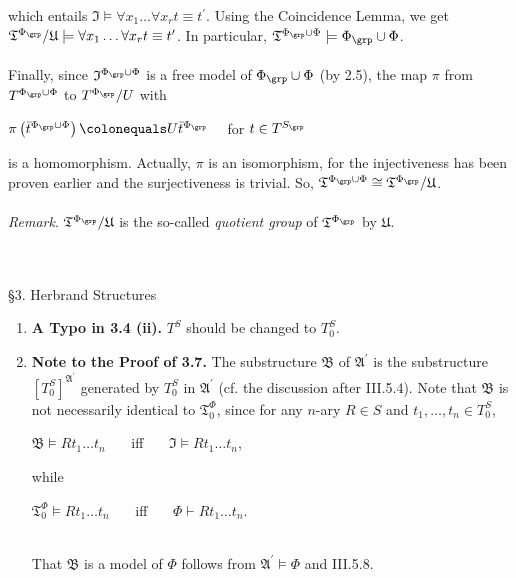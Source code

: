\begin{enumerate}[1.]
which entails $\mathfrak{I} \models \forall x_1 \ldots \forall x_r t \equiv t^\prime$. Using the Coincidence Lemma, we get $\mathfrak{T}^{\Phi_\grp} \slash \mathfrak{U} \models \forall x_1 \ldots \forall x_r t \equiv t^\prime$. In particular, $\mathfrak{T}^{\Phi_\grp \cup \Phi} \models \Phi_\grp \cup \Phi$.\\
\ \\
Finally, since $\mathfrak{I}^{\Phi_\grp \cup \Phi}$ is a free model of $\Phi_\grp \cup \Phi$ (by 2.5), the map $\pi$ from $T^{\Phi_\grp \cup \Phi}$ to $T^{\Phi_\grp} \slash U$ with
\begin{center}
$\pi \left( \bar{t}^{\Phi_\grp \cup \Phi} \right) \colonequals U\bar{t}^{\Phi_\grp}$ \ \ for $t \in T^{S_\grp}$
\end{center}
is a homomorphism. Actually, $\pi$ is an isomorphism, for the injectiveness has been proven earlier and the surjectiveness is trivial. So, $\mathfrak{T}^{\Phi_\grp \cup \Phi} \cong \mathfrak{T}^{\Phi_\grp} \slash \mathfrak{U}$.\\
\ \\
\textit{Remark}. $\mathfrak{T}^{\Phi_\grp} \slash \mathfrak{U}$ is the so-called \emph{quotient group} of $\mathfrak{T}^{\Phi_\grp}$ by $\mathfrak{U}$.
\end{enumerate}
\
\\
\\
{\large \S3. Herbrand Structures}
\begin{enumerate}[1.]
\item \textbf{A Typo in 3.4 (ii).} $T^S$ should be changed to $T_0^S$.
%
\item \textbf{Note to the Proof of 3.7.} The substructure $\mathfrak{B}$ of $\mathfrak{A}^\prime$ is the substructure $\left[ T_0^S \right]^{\mathfrak{A}^\prime}$ generated by $T_0^S$ in $\mathfrak{A}^\prime$ (cf. the discussion after III.5.4). Note that $\mathfrak{B}$ is not necessarily identical to $\mathfrak{T}_0^\Phi$, since for any $n$-ary $R \in S$ and $t_1, \ldots, t_n \in T_0^S$,
\begin{center}
$\mathfrak{B} \models Rt_1 \ldots t_n$ \ \ \ iff \ \ \ $\mathfrak{I} \models Rt_1 \ldots t_n$,
\end{center}
while
\begin{center}
$\mathfrak{T}_0^\Phi \models Rt_1 \ldots t_n$ \ \ \ iff \ \ \ $\Phi \vdash Rt_1 \ldots t_n$.
\end{center}
\ \\
That $\mathfrak{B}$ is a model of $\Phi$ follows from $\mathfrak{A}^\prime \models \Phi$ and III.5.8.
%
\end{enumerate}
